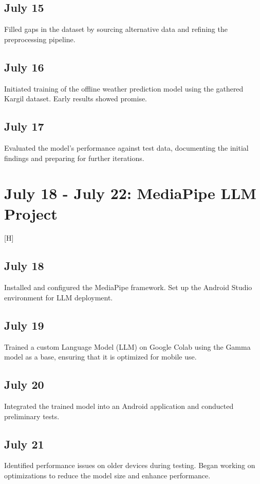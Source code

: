 \documentclass{report}
\begin{document}
\subsection*{July 15}
Filled gaps in the dataset by sourcing alternative data and refining the preprocessing pipeline.

\subsection*{July 16}
Initiated training of the offline weather prediction model using the gathered Kargil dataset. Early results showed promise.

\subsection*{July 17}
Evaluated the model’s performance against test data, documenting the initial findings and preparing for further iterations.

\section{July 18 - July 22: MediaPipe LLM Project}[H]

\subsection*{July 18}
Installed and configured the MediaPipe framework. Set up the Android Studio environment for LLM deployment.

\subsection*{July 19}
Trained a custom Language Model (LLM) on Google Colab using the Gamma model as a base, ensuring that it is optimized for mobile use.

\subsection*{July 20}
Integrated the trained model into an Android application and conducted preliminary tests.

\subsection*{July 21}
Identified performance issues on older devices during testing. Began working on optimizations to reduce the model size and enhance performance.
\end{document}
